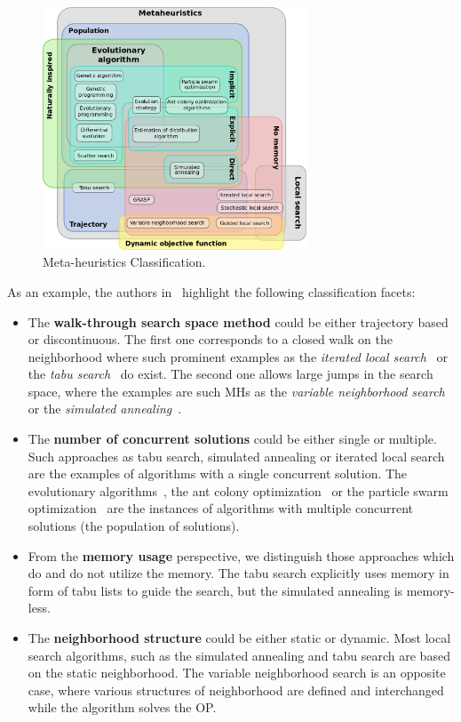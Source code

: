 \begin{figure}
	\centering
	\includegraphics[width=0.7\textwidth]{graphics/Background/Metaheuristics_classification}
	\caption{Meta-heuristics Classification.}
	\label{BG: MH classification}
\end{figure}

As an example, the authors in~\cite{birattari2001classification} highlight the following classification facets:
\begin{itemize}
	\item The \textbf{walk-through search space method} could be either trajectory based or discontinuous. The first one corresponds to a closed walk on the neighborhood where such prominent examples as the \textit{iterated local search}~\cite{lourencco2003iterated} or the \textit{tabu search}~\cite{glover1989tabu} do exist. The second one allows large jumps in the search space, where the examples are such MHs as the \textit{variable neighborhood search}~\cite{hansen2003variable} or the \textit{simulated annealing}~\cite{kirkpatrick1983optimization}.
	
	\item The \textbf{number of concurrent solutions} could be either single or multiple. Such approaches as tabu search, simulated annealing or iterated local search are the examples of algorithms with a single concurrent solution. The evolutionary algorithms~\cite{eiben2015evolutionary}, the ant colony optimization~\cite{dorigo2007ant} or the particle swarm optimization~\cite{kennedy1995particle} are the instances of algorithms with multiple concurrent solutions (the population of solutions).
	
	\item From the \textbf{memory usage} perspective, we distinguish those approaches which do and do not utilize the memory. The tabu search explicitly uses memory in form of tabu lists to guide the search, but the simulated annealing is memory-less.
	
	\item The \textbf{neighborhood structure} could be either static or dynamic. Most local search algorithms, such as the simulated annealing and tabu search are based on the static neighborhood. The variable neighborhood search is an opposite case, where various structures of neighborhood are defined and interchanged while the algorithm solves the OP. 
\end{itemize}

